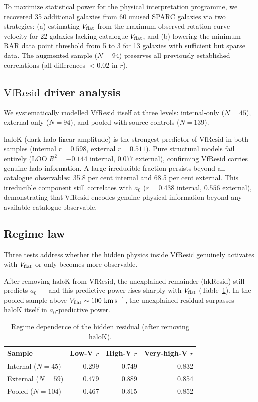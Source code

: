 \documentclass[fleqn,usenatbib]{mnras}
\newcommand{\azero}{a_0}
\newcommand{\vflat}{V_{\rm flat}}
\newcommand{\vfresid}{\mathrm{VfResid}}
\newcommand{\haloK}{\mathrm{haloK}}
\newcommand{\loo}{\mathrm{LOO}}
\newcommand{\kms}{{\rm km\,s^{-1}}}
\begin{document}
To maximize statistical power for the physical interpretation programme,
we recovered 35 additional galaxies from 60 unused SPARC galaxies via two
strategies: (a) estimating $\vflat$ from the maximum observed rotation
curve velocity for 22 galaxies lacking catalogue $\vflat$, and (b) lowering
the minimum RAR data point threshold from 5 to 3 for 13 galaxies with
sufficient but sparse data. The augmented sample ($N = 94$) preserves all
previously established correlations (all differences $< 0.02$ in $r$).

\subsection{$\vfresid$ driver analysis}
\label{sec:drivers}

We systematically modelled $\vfresid$ itself at three levels: internal-only
($N = 45$), external-only ($N = 94$), and pooled with source controls
($N = 139$).

$\haloK$ (dark halo linear amplitude) is the strongest predictor of
$\vfresid$ in both samples (internal $r = 0.598$, external $r = 0.511$).
Pure structural models fail entirely ($\loo\;R^2 = -0.144$ internal,
$0.077$ external), confirming $\vfresid$ carries genuine halo information.
A large irreducible fraction persists beyond all catalogue observables:
35.8 per cent internal and 68.5 per cent external. This irreducible
component still correlates with $\azero$ ($r = 0.438$ internal,
$0.556$ external), demonstrating that $\vfresid$ encodes genuine physical
information beyond any available catalogue observable.

\subsection{Regime law}
\label{sec:regimelaw}

Three tests address whether the hidden physics inside $\vfresid$ genuinely
activates with $\vflat$ or only becomes more observable.

After removing $\haloK$ from $\vfresid$, the unexplained remainder
(hkResid) still predicts $\azero$ --- and this predictive power rises
sharply with $\vflat$ (Table~\ref{tab:regimelaw}). In the pooled sample
above $\vflat \sim 100~\kms$, the unexplained residual surpasses $\haloK$
itself in $\azero$-predictive power.

\begin{table}
\centering
\caption{Regime dependence of the hidden residual (after removing $\haloK$).}
\label{tab:regimelaw}
\begin{tabular}{@{}lrrr@{}}
\hline
Sample & Low-V $r$ & High-V $r$ & Very-high-V $r$ \\
\hline
Internal ($N=45$) & 0.299 & 0.749 & 0.832 \\
External ($N=59$) & 0.479 & 0.889 & 0.854 \\
Pooled ($N=104$) & 0.467 & 0.815 & 0.852 \\
\hline
\end{tabular}
\end{table}
\end{document}
